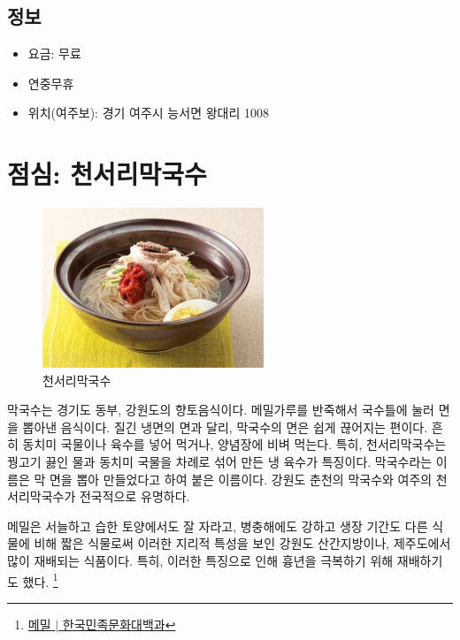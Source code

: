 \subsection{정보}
\begin{itemize}
    \item 요금: 무료
    \item 연중무휴
    \item 위치(여주보): 경기 여주시 능서면 왕대리 1008 
\end{itemize}

\section{점심: 천서리막국수}


\begin{figure}[ht]
    \centering
    \includegraphics[width=.6\textwidth]{img/막국수.jpg}
    \caption{천서리막국수\protect\footnotemark}
    \label{fig:my_labe71}
\end{figure}
\footnotetext{\href{https://terms.naver.com/entry.naver?docId=1627391&cid=48179&categoryId=48238}{[천서리막국수 $|$ 전통향토음식 용어사전}}




막국수는 경기도 동부, 강원도의 향토음식이다. 메밀가루를 반죽해서 국수틀에 눌러 면을 뽑아낸 음식이다.
질긴 냉면의 면과 달리, 막국수의 면은 쉽게 끊어지는 편이다.
흔히 동치미 국물이나 육수를 넣어 먹거나, 양념장에 비벼 먹는다.
특히, 천서리막국수는 꿩고기 끓인 물과 동치미 국물을 차례로 섞어 만든 냉 육수가 특징이다.
막국수라는 이름은 막 면을 뽑아 만들었다고 하여 붙은 이름이다.
강원도 춘천의 막국수와 여주의 천서리막국수가 전국적으로 유명하다.


메밀은 서늘하고 습한 토양에서도 잘 자라고, 병충해에도 강하고 생장 기간도 다른 식물에 비해 짧은 식물로써
이러한 지리적 특성을 보인 강원도 산간지방이나, 제주도에서 많이 재배되는 식품이다. 특히, 이러한 특징으로 인해
흉년을 극복하기 위해 재배하기도 했다.
\footnote{\href{https://terms.naver.com/entry.naver?docId=545707&cid=46640&categoryId=46640}{메밀 $|$ 한국민족문화대백과}}


